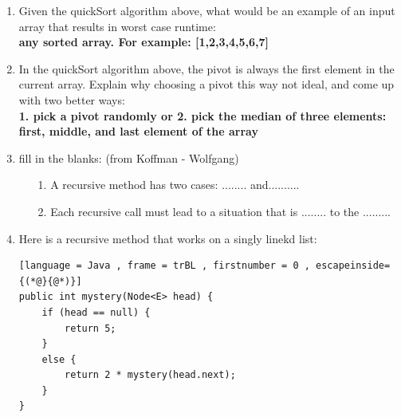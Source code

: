 \documentclass[letter]{article}
\begin{document}
\begin{enumerate}[1.]
\begin{lstlisting}[language = Java , frame = trBL , firstnumber = 0 , escapeinside={(*@}{@*)}]
    int up = start + 1;
    int down = stop;
    boolean done = false;

    while (!done) {
        while (up < stop && array[up].compareTo(pivot) < 0) {
            up++;
        }
        
        while (down > start && array[down].compareTo(pivot) > 0) {
            down--;
        }

        if (up < down) {
            swap(array, up, down);
            up++;
            down--;
        } else {
            done = true;
            swap(arr, start, down);
        }
    }
    return down;
}
\end{lstlisting}

    
     \item Given the quickSort algorithm above, what would be an example of an input array that results in worst case runtime: \\

     \textbf{any sorted array. For example: [1,2,3,4,5,6,7]}\\


     \item In the quickSort algorithm above, the pivot is always the first element in the current array. Explain why choosing a pivot this way not ideal, and come up with two better ways:\\


     \textbf{1. pick a pivot randomly or 2. pick the median of three elements: first, middle, and last element of the array}\\

    \item fill in the blanks: (from Koffman - Wolfgang)
    
        \begin{itemize}
            \item [1.] A recursive method has two cases: ........ and..........
            \item [2.] Each recursive call must lead to a situation that is ........ to the .........
        \end{itemize}

    \item Here is a recursive method that works on a singly linekd list:\\

\begin{lstlisting}[language = Java , frame = trBL , firstnumber = 0 , escapeinside={(*@}{@*)}]
public int mystery(Node<E> head) {
    if (head == null) {
        return 5;
    }
    else {
        return 2 * mystery(head.next);
    }
}
\end{lstlisting}


\end{enumerate}
\end{document}
